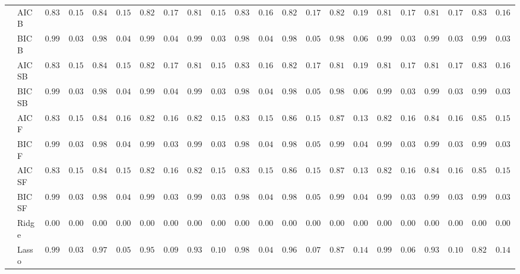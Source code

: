 \begin{tabular}{p{0.2cm}p{1cm}|p{0.6cm}p{0.6cm}|p{0.6cm}p{0.6cm}p{0.6cm}p{0.6cm}p{0.6cm}p{0.6cm}|p{0.6cm}p{0.6cm}p{0.6cm}p{0.6cm}p{0.6cm}p{0.6cm}|p{0.6cm}p{0.6cm}p{0.6cm}p{0.6cm}p{0.6cm}p{0.6cm}}
 & AIC B  & $0.8317$ & $0.1526$ & $0.8450$ & $0.1576$ & $0.8217$ & $0.1729$ & $0.8183$ & $0.1573$ & $0.8317$ & $0.1633$ & $0.8250$ & $0.1747$ & $0.8200$ & $0.1934$ & $0.8183$ & $0.1710$ & $0.8183$ & $0.1726$ & $0.8317$ & $0.1633$ \\
 & BIC B  & $0.9917$ & $0.0365$ & $0.9883$ & $0.0489$ & $0.9900$ & $0.0463$ & $0.9950$ & $0.0371$ & $0.9883$ & $0.0427$ & $0.9850$ & $0.0535$ & $0.9850$ & $0.0631$ & $0.9933$ & $0.0328$ & $0.9917$ & $0.0365$ & $0.9917$ & $0.0365$ \\
 & AIC SB  & $0.8317$ & $0.1526$ & $0.8450$ & $0.1576$ & $0.8217$ & $0.1729$ & $0.8183$ & $0.1573$ & $0.8317$ & $0.1633$ & $0.8250$ & $0.1747$ & $0.8183$ & $0.1926$ & $0.8183$ & $0.1710$ & $0.8183$ & $0.1726$ & $0.8317$ & $0.1633$ \\
 & BIC SB  & $0.9917$ & $0.0365$ & $0.9883$ & $0.0489$ & $0.9900$ & $0.0463$ & $0.9950$ & $0.0371$ & $0.9883$ & $0.0427$ & $0.9850$ & $0.0535$ & $0.9850$ & $0.0631$ & $0.9933$ & $0.0328$ & $0.9917$ & $0.0365$ & $0.9917$ & $0.0365$ \\
 & AIC F  & $0.8317$ & $0.1526$ & $0.8467$ & $0.1601$ & $0.8250$ & $0.1698$ & $0.8217$ & $0.1540$ & $0.8383$ & $0.1525$ & $0.8600$ & $0.1530$ & $0.8717$ & $0.1399$ & $0.8250$ & $0.1613$ & $0.8400$ & $0.1640$ & $0.8517$ & $0.1551$ \\
 & BIC F  & $0.9917$ & $0.0365$ & $0.9883$ & $0.0489$ & $0.9933$ & $0.0328$ & $0.9950$ & $0.0371$ & $0.9883$ & $0.0427$ & $0.9850$ & $0.0535$ & $0.9917$ & $0.0435$ & $0.9933$ & $0.0328$ & $0.9917$ & $0.0365$ & $0.9917$ & $0.0365$ \\
 & AIC SF  & $0.8317$ & $0.1526$ & $0.8483$ & $0.1573$ & $0.8250$ & $0.1698$ & $0.8217$ & $0.1540$ & $0.8383$ & $0.1525$ & $0.8600$ & $0.1530$ & $0.8717$ & $0.1399$ & $0.8250$ & $0.1613$ & $0.8400$ & $0.1640$ & $0.8517$ & $0.1551$ \\
 & BIC SF  & $0.9917$ & $0.0365$ & $0.9883$ & $0.0489$ & $0.9933$ & $0.0328$ & $0.9950$ & $0.0371$ & $0.9883$ & $0.0427$ & $0.9850$ & $0.0535$ & $0.9917$ & $0.0435$ & $0.9933$ & $0.0328$ & $0.9917$ & $0.0365$ & $0.9917$ & $0.0365$ \\
 & Ridge  & $0.0000$ & $0.0000$ & $0.0000$ & $0.0000$ & $0.0000$ & $0.0000$ & $0.0000$ & $0.0000$ & $0.0000$ & $0.0000$ & $0.0000$ & $0.0000$ & $0.0000$ & $0.0000$ & $0.0000$ & $0.0000$ & $0.0000$ & $0.0000$ & $0.0000$ & $0.0000$ \\
 & Lasso  & $0.9933$ & $0.0328$ & $0.9767$ & $0.0581$ & $0.9567$ & $0.0966$ & $0.9317$ & $0.1062$ & $0.9883$ & $0.0427$ & $0.9683$ & $0.0738$ & $0.8733$ & $0.1404$ & $0.9900$ & $0.0619$ & $0.9333$ & $0.1059$ & $0.8267$ & $0.1400$ \\

\end{tabular}
